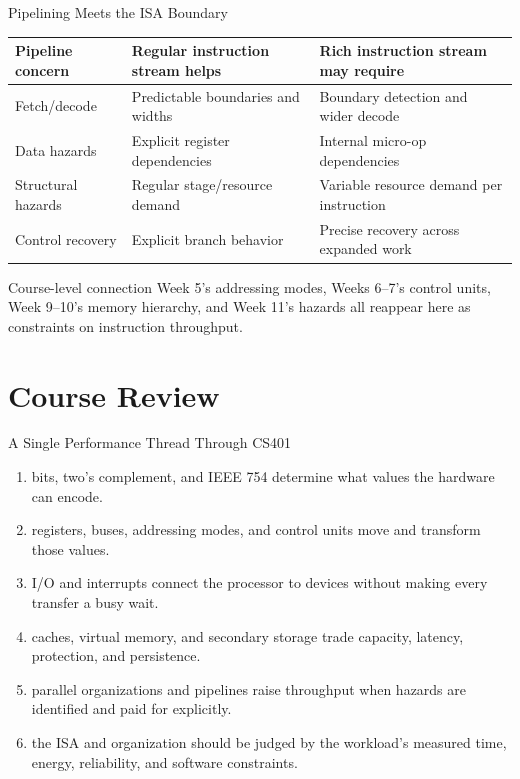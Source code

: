 \documentclass[aspectratio=169]{beamer}
\begin{document}
\begin{frame}{Pipelining Meets the ISA Boundary}
  \begin{tabular}{@{}p{3.1cm}p{4.2cm}p{4.2cm}@{}}
    \toprule
    \textbf{Pipeline concern} & \textbf{Regular instruction stream helps} & \textbf{Rich instruction stream may require}\\
    \midrule
    Fetch/decode & Predictable boundaries and widths & Boundary detection and wider decode\\
    Data hazards & Explicit register dependencies & Internal micro-op dependencies\\
    Structural hazards & Regular stage/resource demand & Variable resource demand per instruction\\
    Control recovery & Explicit branch behavior & Precise recovery across expanded work\\
    \bottomrule
  \end{tabular}
  \vspace{0.2cm}
  \begin{block}{Course-level connection}
    Week 5's addressing modes, Weeks 6--7's control units, Week 9--10's memory
    hierarchy, and Week 11's hazards all reappear here as constraints on
    instruction throughput.
  \end{block}
\end{frame}


\section{Course Review}

\begin{frame}{A Single Performance Thread Through CS401}
  \begin{enumerate}
    \item {} bits, two's complement, and IEEE 754 determine
      what values the hardware can encode.
    \item {} registers, buses, addressing modes, and control
      units move and transform those values.
    \item {} I/O and interrupts connect the processor to
      devices without making every transfer a busy wait.
    \item {} caches, virtual memory, and secondary storage trade
      capacity, latency, protection, and persistence.
    \item {} parallel organizations and pipelines raise throughput
      when hazards are identified and paid for explicitly.
    \item {} the ISA and organization should be judged by the
      workload's measured time, energy, reliability, and software constraints.
  \end{enumerate}
\end{frame}
\end{document}
